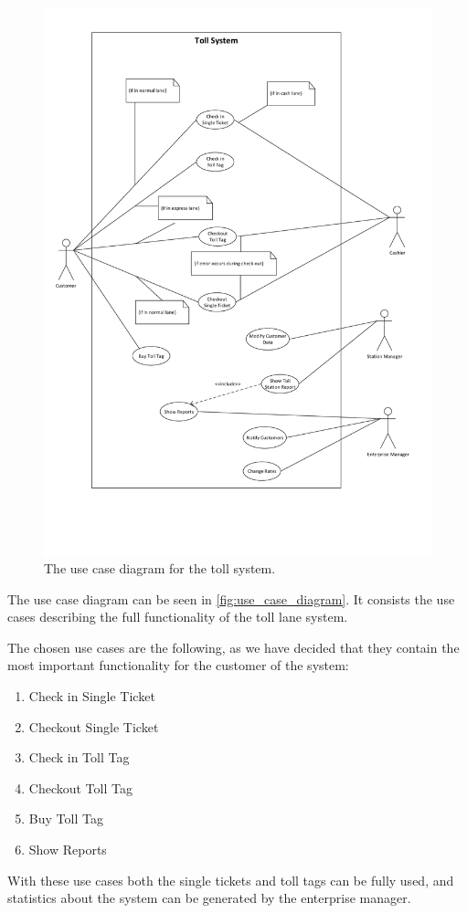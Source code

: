 \begin{figure}
\centering
\includegraphics[width=1\textwidth]{img/use_case_diagram/use_case_diagram}
\vspace{-3cm}
\caption{The use case diagram for the toll system.}
\label{fig:use_case_diagram}
\end{figure}

The use case diagram can be seen in \autoref{fig:use_case_diagram}. It consists the use cases describing the full functionality of the toll lane system.

The chosen use cases are the following, as we have decided that they contain the most important functionality for the customer of the system:
\begin{enumerate}
\item Check in Single Ticket
\item Checkout Single Ticket
\item Check in Toll Tag
\item Checkout Toll Tag
\item Buy Toll Tag
\item Show Reports
\end{enumerate}

With these use cases both the single tickets and toll tags can be fully used, and statistics about the system can be generated by the enterprise manager.
